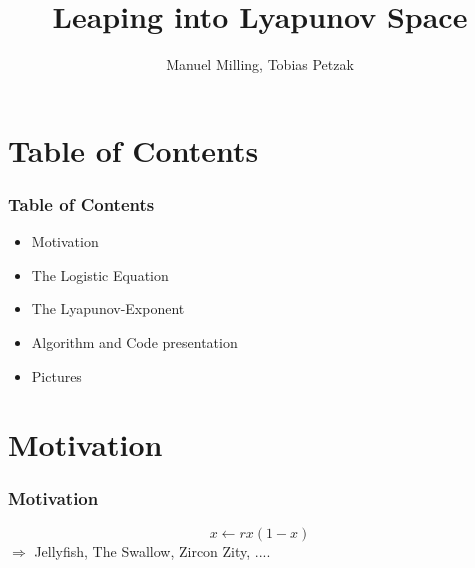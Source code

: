 \documentclass[ignorenonframetext]{beamer}
\title[]{Leaping into Lyapunov Space}
\subtitle{}
\author[Milling, Petzak]{\large{Manuel Milling, Tobias Petzak} \\
}
\institute[Universität Augsburg]{Institut für Physik der Universität Augsburg}
\date[26.08.2016]
\begin{document}
\frame[plain]{\titlepage}

\section*{Table of Contents}
\begin{frame}
\frametitle{Table of Contents}
\begin{itemize}
\item Motivation
\item The Logistic Equation
\item The Lyapunov-Exponent
\item Algorithm and Code presentation
\item Pictures
\end{itemize}
\end{frame}

\section*{Motivation}

\begin{frame}
\frametitle{Motivation}
\begin{center}
\begin{equation}
x \leftarrow rx(1-x)
\end{equation}
$ \Rightarrow$ Jellyfish, The Swallow, Zircon Zity, ....
\end{center}

\end{frame}
\end{document}
